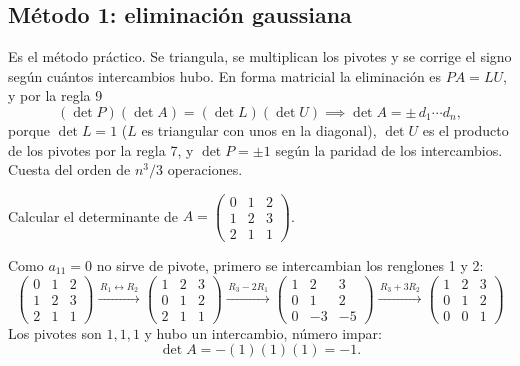 \documentclass[11pt,letterpaper]{article}
\begin{document}

\subsection*{Método 1: eliminación gaussiana}

Es el método práctico. Se triangula, se multiplican los pivotes y se
corrige el signo según cuántos intercambios hubo. En forma matricial
la eliminación es $PA = LU$, y por la regla 9
\[
    (\det P)(\det A) = (\det L)(\det U)
    \implies
    \det A = \pm\, d_1 \cdots d_n ,
\]
porque $\det L = 1$ ($L$ es triangular con unos en la diagonal),
$\det U$ es el producto de los pivotes por la regla 7, y
$\det P = \pm 1$ según la paridad de los intercambios. Cuesta del
orden de $n^3/3$ operaciones.

\begin{ejemplo}
    Calcular el determinante de
    $A = \begin{pmatrix} 0 & 1 & 2 \\ 1 & 2 & 3 \\ 2 & 1 & 1
    \end{pmatrix}$.

    Como $a_{11} = 0$ no sirve de pivote, primero se intercambian los
    renglones 1 y 2:
    \[
        \begin{pmatrix} 0 & 1 & 2 \\ 1 & 2 & 3 \\ 2 & 1 & 1
        \end{pmatrix}
        \xrightarrow{\,R_1 \leftrightarrow R_2\,}
        \begin{pmatrix} 1 & 2 & 3 \\ 0 & 1 & 2 \\ 2 & 1 & 1
        \end{pmatrix}
        \xrightarrow{\,R_3 - 2R_1\,}
        \begin{pmatrix} 1 & 2 & 3 \\ 0 & 1 & 2 \\ 0 & -3 & -5
        \end{pmatrix}
        \xrightarrow{\,R_3 + 3R_2\,}
        \begin{pmatrix} 1 & 2 & 3 \\ 0 & 1 & 2 \\ 0 & 0 & 1
        \end{pmatrix}
    \]
    Los pivotes son $1, 1, 1$ y hubo un intercambio, número impar:
    \[
        \det A = -(1)(1)(1) = -1 .
    \]
\end{ejemplo}
\end{document}

